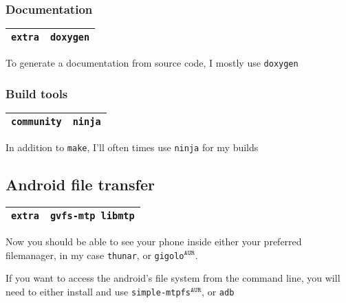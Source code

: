 \documentclass[9pt]{report}
\begin{document}
\vfill\eject

\hypertarget{x-documentation}{\subsubsection{Documentation}}
\begin{center}
\begin{tabular}{|c|c|}
\hline
\texttt{extra} & \texttt{doxygen} \\ 
\hline
\end{tabular}
\end{center}

To generate a documentation from source code, I mostly use \texttt{doxygen}



\vfill\eject

\hypertarget{x-build-tools}{\subsubsection{Build tools}}
\begin{center}
\begin{tabular}{|c|c|}
\hline
\texttt{community} & \texttt{ninja} \\ 
\hline
\end{tabular}
\end{center}

In addition to \texttt{make}, I’ll often times use \texttt{ninja} for my builds



\vfill\eject

\hypertarget{x-android-file-transfer}{\subsection{Android file transfer}}
\begin{center}
\begin{tabular}{|c|c|}
\hline
\texttt{extra} & \texttt{gvfs-mtp libmtp} \\ 
\hline
\end{tabular}
\end{center}

Now you should be able to see your phone inside either your preferred filemanager, in my case \texttt{thunar}, or \texttt{gigolo}${}^{\texttt{AUR}}$.


If you want to access the android’s file system from the command line, you will need to either install and use \texttt{simple-mtpfs}${}^{\texttt{AUR}}$, or \texttt{adb}
\end{document}
